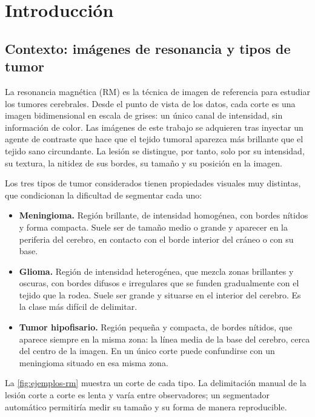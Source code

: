 \section{Introducción}\label{sec:introduccion}

\subsection{Contexto: imágenes de resonancia y tipos de tumor}\label{subsec:contexto}

La resonancia magnética (RM) es la técnica de imagen de referencia para estudiar los tumores cerebrales. Desde el punto de vista de los datos, cada corte es una imagen bidimensional en escala de grises: un único canal de intensidad, sin información de color. Las imágenes de este trabajo se adquieren tras inyectar un agente de contraste que hace que el tejido tumoral aparezca más brillante que el tejido sano circundante. La lesión se distingue, por tanto, solo por su intensidad, su textura, la nitidez de sus bordes, su tamaño y su posición en la imagen.

Los tres tipos de tumor considerados tienen propiedades visuales muy distintas, que condicionan la dificultad de segmentar cada uno:

\begin{itemize}
  \item \textbf{Meningioma.} Región brillante, de intensidad homogénea, con bordes nítidos y forma compacta. Suele ser de tamaño medio o grande y aparecer en la periferia del cerebro, en contacto con el borde interior del cráneo o con su base.
  \item \textbf{Glioma.} Región de intensidad heterogénea, que mezcla zonas brillantes y oscuras, con bordes difusos e irregulares que se funden gradualmente con el tejido que la rodea. Suele ser grande y situarse en el interior del cerebro. Es la clase más difícil de delimitar.
  \item \textbf{Tumor hipofisario.} Región pequeña y compacta, de bordes nítidos, que aparece siempre en la misma zona: la línea media de la base del cerebro, cerca del centro de la imagen. En un único corte puede confundirse con un meningioma situado en esa misma zona.
\end{itemize}

La \cref{fig:ejemplos-rm} muestra un corte de cada tipo. La delimitación manual de la lesión corte a corte es lenta y varía entre observadores; un segmentador automático permitiría medir su tamaño y su forma de manera reproducible.

